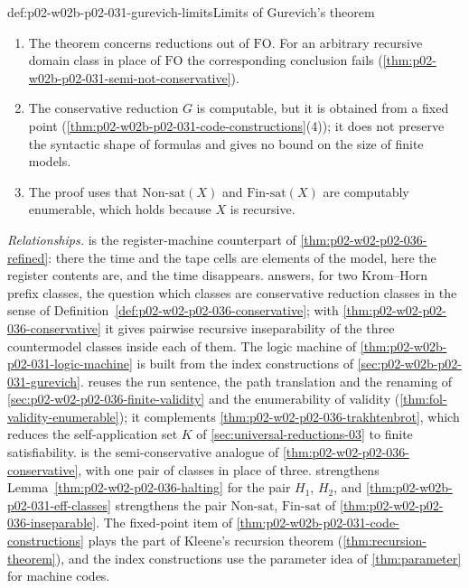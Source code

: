 \begin{hbwarning}{def:p02-w02b-p02-031-gurevich-limits}{Limits of Gurevich's theorem}
\begin{enumerate}
\item The theorem concerns reductions out of \(\mathrm{FO}\).  For an
  arbitrary recursive domain class in place of \(\mathrm{FO}\) the
  corresponding conclusion fails
  (\cref{thm:p02-w02b-p02-031-semi-not-conservative}).
\item The conservative reduction \(G\) is computable, but it is obtained from
  a fixed point (\cref{thm:p02-w02b-p02-031-code-constructions}(4)); it does
  not preserve the syntactic shape of formulas and gives no bound on the size
  of finite models.
\item The proof uses that \(\mathrm{Non\text{-}sat}(X)\) and
  \(\mathrm{Fin\text{-}sat}(X)\) are computably enumerable, which holds
  because \(X\) is recursive.
\end{enumerate}
\end{hbwarning}

\emph{Relationships.}   is the
register-machine counterpart of \cref{thm:p02-w02-p02-036-refined}: there the
time and the tape cells are elements of the model, here the register contents
are, and the time disappears.   answers,
for two Krom--Horn prefix classes, the question which classes are conservative
reduction classes in the sense of
Definition~\ref{def:p02-w02-p02-036-conservative}; with
\cref{thm:p02-w02-p02-036-conservative} it gives pairwise recursive
inseparability of the three countermodel classes inside each of them.  The
logic machine of \cref{thm:p02-w02b-p02-031-logic-machine} is built from the
index constructions of \cref{sec:p02-w02b-p02-031-gurevich}.
 reuses the
run sentence, the path translation and the renaming of
\cref{sec:p02-w02-p02-036-finite-validity} and the enumerability of validity
(\cref{thm:fol-validity-enumerable}); it complements
\cref{thm:p02-w02-p02-036-trakhtenbrot}, which reduces the self-application set
\(K\) of \cref{sec:universal-reductions-03} to finite satisfiability.
 is the semi-conservative analogue
of \cref{thm:p02-w02-p02-036-conservative}, with one pair of classes in place
of three.   strengthens
Lemma~\ref{thm:p02-w02-p02-036-halting} for the pair \(H_1\), \(H_2\), and
\cref{thm:p02-w02b-p02-031-eff-classes} strengthens the pair
\(\mathrm{Non\text{-}sat}\), \(\mathrm{Fin\text{-}sat}\) of
\cref{thm:p02-w02-p02-036-inseparable}.  The fixed-point item of
\cref{thm:p02-w02b-p02-031-code-constructions} plays the part of Kleene's
recursion theorem (\cref{thm:recursion-theorem}), and the index
constructions use the parameter idea of \cref{thm:parameter} for machine
codes.

